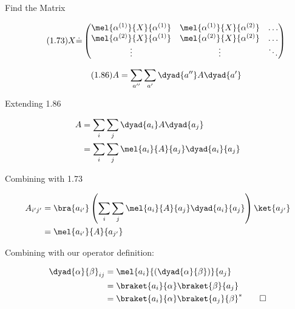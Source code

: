 \begin{answer}

\begin{answerpart}{Find the Matrix}

  \begin{equation}
    \tag{1.73}
    X \dot{=}
    \begin{pmatrix}
      \mel{\alpha^{(1)}}{X}{\alpha^{(1)}} & \mel{\alpha^{(1)}}{X}{\alpha^{(2)}} & \ldots \\
      \mel{\alpha^{(2)}}{X}{\alpha^{(1)}} & \mel{\alpha^{(2)}}{X}{\alpha^{(2)}} & \ldots \\
      \vdots & \vdots & \ddots\\
    \end{pmatrix}
  \end{equation}

  \begin{equation}
    \tag{1.86}
    A = \sum_{a''}\sum_{a'} \dyad{a''}A\dyad{a'}
  \end{equation}

  Extending 1.86

  \begin{equation}
    \begin{split}
      A
      &= \sum_{i}\sum_{j} \dyad{a_i}A\dyad{a_j}\\
      &= \sum_{i}\sum_{j}\mel{a_i}{A}{a_j}\dyad{a_i}{a_j}\\
    \end{split}
  \end{equation}

  Combining with 1.73
  
  \begin{equation}
    \begin{split}
      A_{i'j'}
      &= \bra{a_{i'}} \left(\sum_{i}\sum_{j}\mel{a_i}{A}{a_j}\dyad{a_i}{a_j}\right) \ket{a_{j'}}\\
      &= \mel{a_{i'}}{A}{a_{j'}}
    \end{split}
  \end{equation}

  Combining with our operator definition:
  
  \begin{equation}
    \begin{split}
      \dyad{\alpha}{\beta}_{ij}
      &= \mel{a_i}{(\dyad{\alpha}{\beta})}{a_j}\\
      &= \braket{a_i}{\alpha}\braket{\beta}{a_j}\\
      &= \braket{a_i}{\alpha}\braket{a_j}{\beta}^* \qed\\
    \end{split}
  \end{equation}
  

\end{answerpart}
\end{answer}
